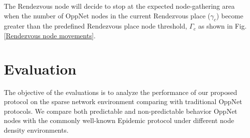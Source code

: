\documentclass[conference]{IEEEtran}
\begin{document}
The Rendezvous node will decide to stop at the expected node-gathering area when the number of OppNet nodes in the current Rendezvous place ($\gamma_{c}$) become greater than the predefined Rendezvous place node threshold, $\Gamma_{c}$ as shown in Fig. \ref{Rendezvous node movements}.  

\section{Evaluation}
The objective of the evaluations is to analyze the performance of our proposed protocol on the sparse network environment comparing with traditional OppNet protocols.
We compare both predictable and non-predictable behavior OppNet nodes with the commonly well-known Epidemic protocol\cite{Vahdat2000} under different node density environments.

\end{document}
